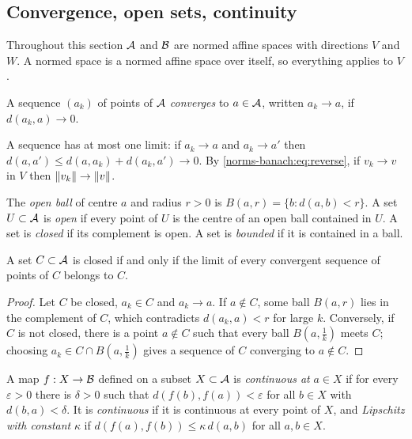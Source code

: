 \begin{notechapter}
\section{Convergence, open sets, continuity}
\label{norms-banach:sec:topology}

Throughout this section $\mathcal{A}$ and $\mathcal{B}$ are normed affine spaces with
directions $V$ and $W$. A normed space is a normed affine space over
itself, so everything applies to $V$.

\begin{definition}[Convergence]
A sequence $(a_k)$ of points of $\mathcal{A}$ \emph{converges} to $a\in\mathcal{A}$,
written $a_k\to a$, if $d(a_k, a)\to0$.
\end{definition}

A sequence has at most one limit: if $a_k\to a$ and $a_k\to a'$ then
$d(a, a')\leq d(a, a_k) + d(a_k, a')\to0$. By
\eqref{norms-banach:eq:reverse}, if $v_k\to v$ in $V$ then
$\left\|v_k\right\|\to\left\|v\right\|$.

\begin{definition}
The \emph{open ball} of centre $a$ and radius $r > 0$ is
$B(a, r) = \{b : d(a, b) < r\}$. A set $U\subset\mathcal{A}$ is \emph{open} if
every point of $U$ is the centre of an open ball contained in $U$. A set
is \emph{closed} if its complement is open. A set is \emph{bounded} if it
is contained in a ball.
\end{definition}

\begin{proposition}\label{norms-banach:prop:closed}
A set $C\subset\mathcal{A}$ is closed if and only if the limit of every convergent
sequence of points of $C$ belongs to $C$.
\end{proposition}

\begin{proof}
Let $C$ be closed, $a_k\in C$ and $a_k\to a$. If $a\notin C$, some ball
$B(a, r)$ lies in the complement of $C$, which contradicts $d(a_k, a) < r$
for large $k$. Conversely, if $C$ is not closed, there is a point
$a\notin C$ such that every ball $B(a, \frac1k)$ meets $C$; choosing
$a_k\in C\cap B(a, \frac1k)$ gives a sequence of $C$ converging to
$a\notin C$.
\end{proof}

\begin{definition}
A map $f:X\to\mathcal{B}$ defined on a subset $X\subset\mathcal{A}$ is \emph{continuous
at} $a\in X$ if for every $\varepsilon > 0$ there is $\delta > 0$ such that
$d(f(b), f(a)) < \varepsilon$ for all $b\in X$ with $d(b, a) < \delta$. It
is \emph{continuous} if it is continuous at every point of $X$, and
\emph{Lipschitz with constant} $\kappa$ if
$d(f(a), f(b))\leq\kappa\,d(a, b)$ for all $a, b\in X$.
\end{definition}


\end{notechapter}
